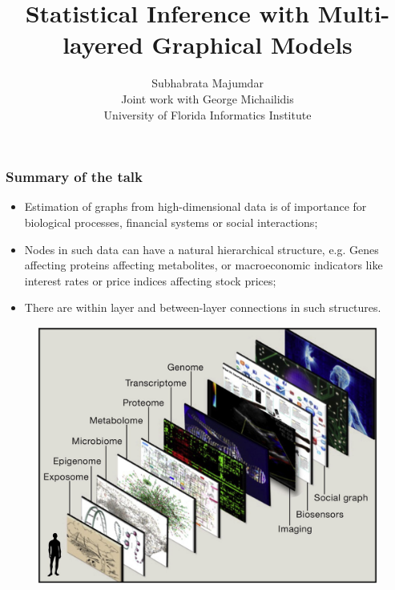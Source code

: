 \documentclass[10pt]{beamer}
\title[ Multi-layered Graphical Models]
{\Large  
Statistical Inference with Multi-layered Graphical Models}
\author[Majumdar and Michailidis]{Subhabrata Majumdar\\
{\footnotesize Joint work with George Michailidis\\
University of Florida Informatics Institute}}
\institute[]{Savvysherpa, Inc., Minneapolis, MN\\
May 3, 2018}
\date{}
\date[May 3, 2018]
\theoremstyle{definition}
\begin{document}

\frame{ \titlepage}


\begin{frame}
\frametitle{Summary of the talk}
\begin{itemize}
\item Estimation of graphs from high-dimensional data is of importance for {\colbit biological processes, financial systems or social interactions};

\vspace{1em}
\item Nodes in such data can have a {\colbit natural hierarchical structure}, e.g. Genes affecting proteins affecting metabolites, or macroeconomic indicators like interest rates or price indices affecting stock prices;

\vspace{1em}
\item There are {\colbit within layer and between-layer connections} in such structures.
\end{itemize}
\end{frame}

\begin{frame}

\begin{figure}
\centering
\includegraphics[width=.9\textwidth]{multi-omics2}
\end{figure}

\end{frame}
\end{document}
